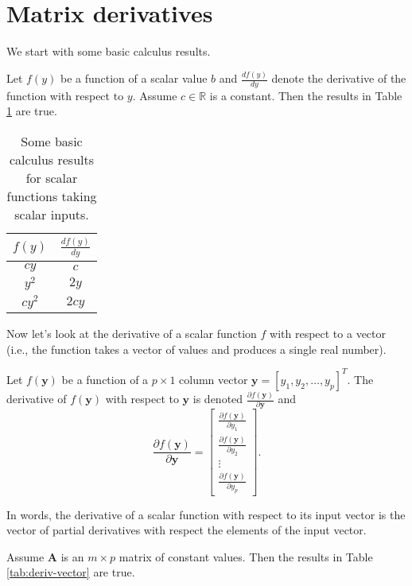 \documentclass[
]{book}
\theoremstyle{definition}
\theoremstyle{definition}
\theoremstyle{definition}
\theoremstyle{definition}
\theoremstyle{remark}
\begin{document}
\hypertarget{matrix-derivatives}{%
\section{Matrix derivatives}\label{matrix-derivatives}}

We start with some basic calculus results.

Let \(f(y)\) be a function of a scalar value \(b\) and \(\frac{df(y)}{dy}\) denote the derivative of the function with respect to \(y\). Assume \(c \in \mathbb{R}\) is a constant. Then the results in Table \ref{tab:deriv-scalar} are true.

\begin{table}

\caption{\label{tab:unnamed-chunk-176}Some basic calculus results for scalar functions taking scalar inputs.\label{tab:deriv-scalar}}
\centering
\begin{tabular}[t]{c|c}
\hline
$f(y)$ & $\frac{df(y)}{dy}$\\
\hline
$cy$ & $c$\\
\hline
$y^2$ & $2y$\\
\hline
$c y^2$ & $2cy$\\
\hline
\end{tabular}
\end{table}

Now let's look at the derivative of a scalar function \(f\) with respect to a vector (i.e., the function takes a vector of values and produces a single real number).

Let \(f(\mathbf{y})\) be a function of a \(p\times 1\) column vector \(\mathbf{y}=[y_1, y_2, \ldots, y_p]^T\). The derivative of \(f(\mathbf{y})\) with respect to \(\mathbf{y}\) is denoted \(\frac{\partial f(\mathbf{y})}{\partial \mathbf{y}}\) and
\[
\frac{\partial f(\mathbf{y})}{\partial \mathbf{y}} = \begin{bmatrix}
\frac{\partial f(\mathbf{y})}{\partial y_1}\\
\frac{\partial f(\mathbf{y})}{\partial y_2}\\
\vdots \\
\frac{\partial f(\mathbf{y})}{\partial y_p}
\end{bmatrix}.
\]

In words, the derivative of a scalar function with respect to its input vector is the vector of partial derivatives with respect the elements of the input vector.

Assume \(\mathbf{A}\) is an \(m\times p\) matrix of constant values. Then the results in Table \ref{tab:deriv-vector} are true.
\end{document}
